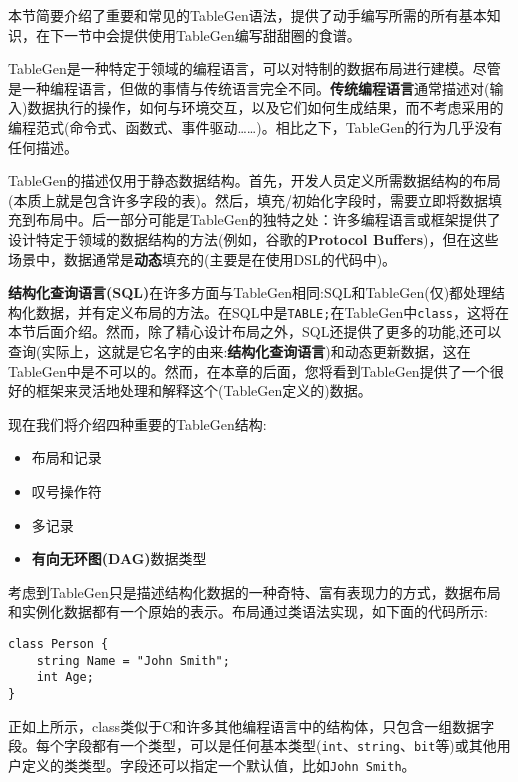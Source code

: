 
本节简要介绍了重要和常见的TableGen语法，提供了动手编写所需的所有基本知识，在下一节中会提供使用TableGen编写甜甜圈的食谱。

TableGen是一种特定于领域的编程语言，可以对特制的数据布局进行建模。尽管是一种编程语言，但做的事情与传统语言完全不同。\textbf{传统编程语言}通常描述对(输入)数据执行的操作，如何与环境交互，以及它们如何生成结果，而不考虑采用的编程范式(命令式、函数式、事件驱动……)。相比之下，TableGen的行为几乎没有任何描述。

TableGen的描述仅用于静态数据结构。首先，开发人员定义所需数据结构的布局(本质上就是包含许多字段的表)。然后，填充/初始化字段时，需要立即将数据填充到布局中。后一部分可能是TableGen的独特之处：许多编程语言或框架提供了设计特定于领域的数据结构的方法(例如，谷歌的\textbf{Protocol Buffers})，但在这些场景中，数据通常是\textbf{动态}填充的(主要是在使用DSL的代码中)。

\textbf{结构化查询语言(SQL)}在许多方面与TableGen相同:SQL和TableGen(仅)都处理结构化数据，并有定义布局的方法。在SQL中是\texttt{TABLE;}在TableGen中\texttt{class}，这将在本节后面介绍。然而，除了精心设计布局之外，SQL还提供了更多的功能,还可以查询(实际上，这就是它名字的由来:\textbf{结构化查询语言})和动态更新数据，这在TableGen中是不可以的。然而，在本章的后面，您将看到TableGen提供了一个很好的框架来灵活地处理和解释这个(TableGen定义的)数据。

现在我们将介绍四种重要的TableGen结构:

\begin{itemize}
\item 布局和记录
\item 叹号操作符
\item 多记录
\item \textbf{有向无环图(DAG)}数据类型
\end{itemize}


考虑到TableGen只是描述结构化数据的一种奇特、富有表现力的方式，数据布局和实例化数据都有一个原始的表示。布局通过类语法实现，如下面的代码所示:

\begin{lstlisting}[style=styleCXX]
class Person {
	string Name = "John Smith";
	int Age;
}
\end{lstlisting}

正如上所示，class类似于C和许多其他编程语言中的结构体，只包含一组数据字段。每个字段都有一个类型，可以是任何基本类型(\texttt{int}、\texttt{string}、\texttt{bit}等)或其他用户定义的类类型。字段还可以指定一个默认值，比如\texttt{John Smith}。

